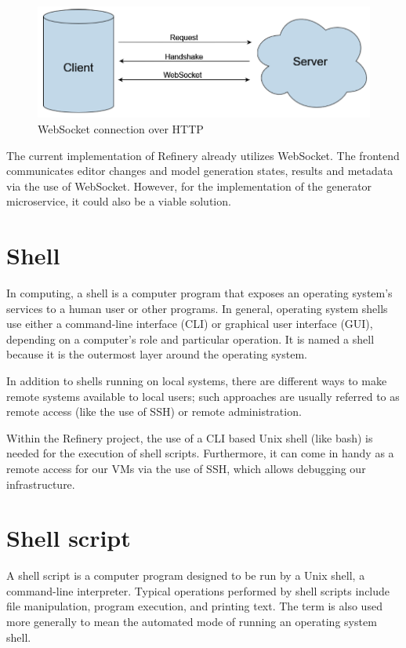 	\begin{figure}[h!]
		\includegraphics{include/imgs/websocket.PNG}
		\caption{WebSocket connection over HTTP}
	\end{figure}

	The current implementation of Refinery already utilizes WebSocket. The frontend communicates editor changes and model generation
	states, results and metadata via the use of WebSocket. However, for the implementation of the generator microservice, it could also be a viable solution.

\section{Shell}
	In computing, a shell \cite{shell} is a computer program that exposes an operating system's services to a human user or other programs. 
	In general, operating system shells use either a command-line interface (CLI) or graphical user interface (GUI), 
	depending on a computer's role and particular operation. It is named a shell because it is the outermost layer around the operating system.

	In addition to shells running on local systems, there are different ways to make remote 
	systems available to local users; such approaches are usually referred to as remote access (like the use of SSH) or remote administration.

	Within the Refinery project, the use of a CLI based Unix shell (like bash) is needed for the execution of shell scripts. Furthermore, it can come in handy 
	as a remote access for our VMs via the use of SSH, which allows debugging our infrastructure.

\section{Shell script}
	A shell script \cite{shellscript} is a computer program designed to be run by a Unix shell, a command-line interpreter. Typical operations performed by shell scripts include file manipulation, program execution, and printing text.
	The term is also used more generally to mean the automated mode of running an operating system shell.

